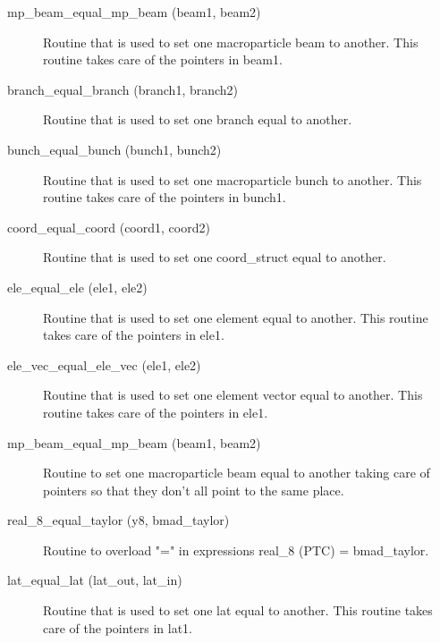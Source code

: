 \begin{description}

\label{r:beam.equal.beam}
\item[mp_beam_equal_mp_beam (beam1, beam2)] \Newline
Routine that is used to set one macroparticle beam to another. This routine
takes care of the pointers in beam1.

\label{r:branch.equal.branch}
\item[branch_equal_branch (branch1, branch2)] \Newline 
Routine that is used to set one branch equal to another. 

\label{r:bunch.equal.bunch}
\item[bunch_equal_bunch (bunch1, bunch2)] \Newline
Routine that is used to set one macroparticle bunch to another. This routine
takes care of the pointers in bunch1.

\label{r:coord.equal.coord}
\item[coord_equal_coord (coord1, coord2)] \Newline
Routine that is used to set one coord_struct equal to another. 

\label{r:ele.equal.ele}
\item[ele_equal_ele (ele1, ele2)] \Newline
Routine that is used to set one element equal to another. 
This routine takes care of the pointers in ele1. 

\label{r:ele.vec.equal.ele.vec}
\item[ele_vec_equal_ele_vec (ele1, ele2)] \Newline
Routine that is used to set one element vector equal to another. 
This routine takes care of the pointers in ele1. 

\label{r:mp.beam.equal.mp.beam}
\item[mp_beam_equal_mp_beam (beam1, beam2)] \Newline 
Routine to set one macroparticle beam equal to another taking care of
pointers so that they don't all point to the same place.

\item[real_8_equal_taylor (y8, bmad_taylor)] \Newline
Routine to overload "=" in expressions real_8 (PTC) = bmad_taylor.

\label{r:lat.equal.lat}
\item[lat_equal_lat (lat_out, lat_in)] \Newline
Routine that is used to set one lat equal to another. 
This routine takes care of the pointers in lat1. 


\end{description}
